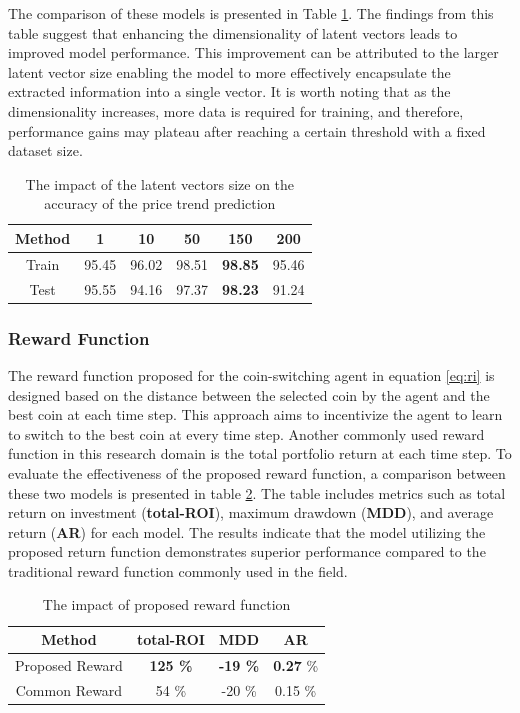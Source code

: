 The comparison of these models is presented in Table \ref{tbl:FE-dim}. The findings from this table suggest that enhancing the dimensionality of latent vectors leads to improved model performance. This improvement can be attributed to the larger latent vector size enabling the model to more effectively encapsulate the extracted information into a single vector. It is worth noting that as the dimensionality increases, more data is required for training, and therefore, performance gains may plateau after reaching a certain threshold with a fixed dataset size.


\begin{table}[h]
	\centering
	\caption{The impact of the latent vectors size on the accuracy of the price trend prediction}
	\label{tbl:FE-dim}
	\begin{tabular}{c | c | c | c | c | c }
		Method & 1 & 10 & 50 & 150 & 200 \\
		\hline
		\hline
		Train & 95.45& 96.02 & 98.51 & \textbf{98.85} & 95.46\\
		Test & 95.55& 94.16 & 97.37 & \textbf{98.23} & 91.24\\
	\end{tabular}
\end{table}

\subsubsection{Reward Function}
The reward function proposed for the coin-switching agent in equation \ref{eq:ri} is designed based on the distance between the selected coin by the agent and the best coin at each time step. This approach aims to incentivize the agent to learn to switch to the best coin at every time step. Another commonly used reward function in this research domain is the total portfolio return at each time step. To evaluate the effectiveness of the proposed reward function, a comparison between these two models is presented in table \ref{tbl:rewards}. The table includes metrics such as total return on investment (\textbf{total-ROI}), maximum drawdown (\textbf{MDD}), and average return (\textbf{AR}) for each model. The results indicate that the model utilizing the proposed return function demonstrates superior performance compared to the traditional reward function commonly used in the field.


\begin{table}[h]
	\centering
	\caption{The impact of proposed reward function}
	\label{tbl:rewards}
	\begin{tabular}{c | c | c | c  }
		Method & total-ROI & MDD & AR \\
		\hline
		\hline
		Proposed Reward & \textbf{125 \%}  & \textbf{-19 \%} & \textbf{0.27}  \% \\
		Common Reward & 54 \%  & -20 \%  & 0.15 \%\\
	\end{tabular}
\end{table}


